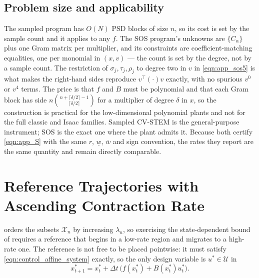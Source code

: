 \documentclass[lettersize,journal]{IEEEtran}
\begin{document}
\subsection{Problem size and applicability}
The sampled program has $O(N)$ PSD blocks of size $n$, so its cost is set by the
sample count and it applies to any $f$. The SOS program's unknowns are
$\{C_\alpha\}$ plus one Gram matrix per multiplier, and its constraints are
coefficient-matching equalities, one per monomial in $(x,v)$ --- the count is
set by the degree, not by a sample count. The restriction of $\sigma_j,\tau_j,
\rho_j$ to degree two in $v$ in \eqref{eqn:app_sos5} is what makes the
right-hand sides reproduce $v^\top(\cdot)v$ exactly, with no spurious $v^0$ or
$v^4$ terms. The price is that $f$ and $B$ must be polynomial and that each
Gram block has side
$n\binom{n+\lceil\delta/2\rceil-1}{\lceil\delta/2\rceil}$ for a multiplier of
degree $\delta$ in $x$, so the construction is practical for the
low-dimensional polynomial plants and not for the full classic and Isaac
families. Sampled CV-STEM is the general-purpose instrument; SOS is the exact
one where the plant admits it. Because both certify \eqref{eqn:app_S} with the
same $r$, $\underline w$, $\overline w$ and sign convention, the rates they
report are the same quantity and remain directly comparable.

\section{Reference Trajectories with Ascending Contraction Rate}\label{app:ascending_ref}

 orders the subsets $\mathcal{X}_n$ by increasing $\lambda_n$,
so exercising the state-dependent bound of  requires a
reference that begins in a low-rate region and migrates to a high-rate one. The
reference is not free to be placed pointwise: it must satisfy
\eqref{eqn:control_affine_system} exactly, so the only design variable is
$u^*\in\mathcal{U}$ in
\begin{equation}\label{eqn:ref_rollout}
    x^*_{t+1} = x^*_t + \Delta t\,\bigl(f(x^*_t)+B(x^*_t)u^*_t\bigr).
\end{equation}
\end{document}
